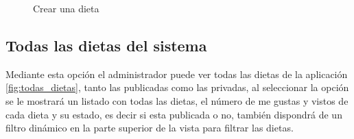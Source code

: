 \begin{figure}[H]
    \centering
    \caption{Crear una dieta}
    \label{fig:crear_dieta}
\end{figure}


\subsection{Todas las dietas del sistema}
Mediante esta opción el administrador puede ver todas las dietas de la aplicación \ref{fig:todas_dietas}, tanto las publicadas como las privadas, al seleccionar la opción se le mostrará un listado con todas las dietas, el número de me gustas y vistos de cada dieta y su estado, es decir si esta publicada o no, también dispondrá de un filtro dinámico en la parte superior de la vista para filtrar las dietas.

